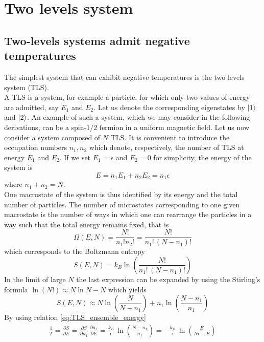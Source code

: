 \chapter{Two levels system}
\label{ch:TLS}

\section{Two-levels systems admit negative temperatures}
The simplest system that can exhibit negative temperatures is the two levels system (TLS). \\
A TLS is a system, for example a particle, for which only two values of energy are admitted, say $E_1$ and $E_2$. Let us denote the 
corresponding eigenstates by $\left| 1 \right\rangle$ and $\left| 2 \right\rangle$. An example of such a system, which we may consider in the following derivations, can be a spin-$1/2$ fermion in a uniform magnetic field.
Let us now consider a system composed of $N$ TLS. It is convenient to introduce the occupation numbers $n_1, n_2$ which denote,
respectively, the number of TLS at energy $E_1$ and $E_2$. If we set $E_1=\epsilon$ and $E_2=0$ for simplicity, the energy of the system is
\begin{equation}
    E = n_1 E_1 + n_2 E_2 = n_1\epsilon
    \label{eq:TLS_ensemble_energy}
\end{equation}
where $n_1 + n_2 = N$. \\
One macrostate of the system is thus identified by its energy and the total number of particles. The number of microstates corresponding 
to one given macrostate is the number of ways in which one can rearrange the particles in a way such that the total energy remains fixed, that is 
\begin{equation*}
    \Omega(E, N) = \frac{N!}{n_1!n_2!} = \frac{N!}{n_1! \, (N-n_1)!}
\end{equation*}
which corresponds to the Boltzmann entropy 
\begin{equation}
    S(E, N) = k_B\ln\left(\frac{N!}{n_1! \, (N-n_1)!}\right)
    \label{eq:TLS_entropy_N}
\end{equation}
In the limit of large $N$ the last expression can be expanded by using the Stirling's formula $\ln(N!) \approx N\ln N - N$ which yields 
\begin{equation}
    S(E, N) \approx N \ln \left(\frac{N}{N-n_1}\right) + n_1 \ln\left(\frac{N-n_1}{n_1}\right)
    \label{eq:TLS_entropy_N_approx}
\end{equation}
By using relation \ref{eq:TLS_ensemble_energy}
\begin{equation}\begin{gathered}
    \frac{1}{T} = \frac{\partial S}{\partial E} = \frac{\partial S}{\partial n_1} \, \frac{\partial n_1}{\partial E} =
    \frac{k_B}{\epsilon} \, \ln\left(\frac{N - n_1}{n_1}\right) = -\frac{k_B}{\epsilon} \, \ln\left(\frac{E}{N\epsilon - E}\right)
\end{gathered} 
\label{eq:T_tls} 
\end{equation}
